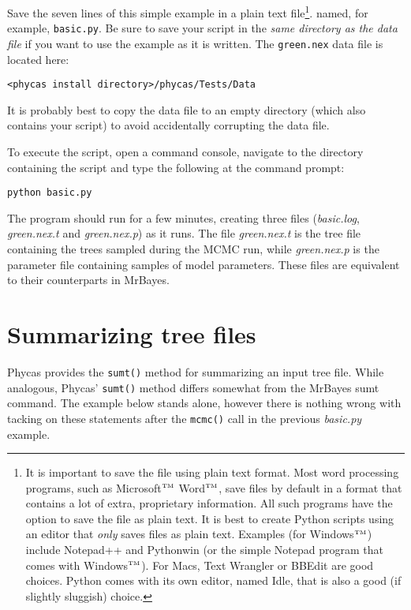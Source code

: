 \documentclass[10pt]{article}
\newcommand{\trademark}[1]{#1${}^{\mbox{\tiny TM}}$}
\newcommand{\pathname}[1]{{\em #1}}
\begin{document}
Save the seven lines of this simple example in a plain text file\footnote{
%
It is important to save the file using plain text format. Most word processing programs, such as \trademark{Microsoft} \trademark{Word}, save files by default in a format that contains a lot of extra, proprietary information. All such programs have the option to save the file as plain text. It is best to create Python scripts using an editor that {\em only} saves files as plain text. Examples (for \trademark{Windows}) include Notepad++ and Pythonwin (or the simple Notepad program that comes with \trademark{Windows}). For Macs, Text Wrangler or BBEdit are good choices. Python comes with its own editor, named Idle, that is also a good (if slightly sluggish) choice.}.
%
named, for example, {\tt basic.py}. Be sure to save your script in the {\em same directory as the data file} if you want to use the example as it is written. The {\tt green.nex} data file is located here:
%
\begin{verbatim}
<phycas install directory>/phycas/Tests/Data
\end{verbatim}
%
It is probably best to copy the data file to an empty directory (which also contains your script) to avoid accidentally corrupting the data file.

To execute the script, open a command console, navigate to the directory containing the script and type the following at the command prompt:
%
\begin{verbatim}
python basic.py
\end{verbatim}
%
The program should run for a few minutes, creating three files (\pathname{basic.log}, \pathname{green.nex.t} and \pathname{green.nex.p}) as it runs. The file \pathname{green.nex.t} is the tree file containing the trees sampled during the MCMC run, while \pathname{green.nex.p} is the parameter file containing samples of model parameters. These files are equivalent to their counterparts in MrBayes.

\section{Summarizing tree files}

Phycas provides the {\tt sumt()} method for summarizing an input tree file. While analogous, Phycas' {\tt sumt()} method differs somewhat from the MrBayes sumt command. The example below stands alone, however there is nothing wrong with tacking on these statements after the {\tt mcmc()} call in the previous \pathname{basic.py} example.
\end{document}
